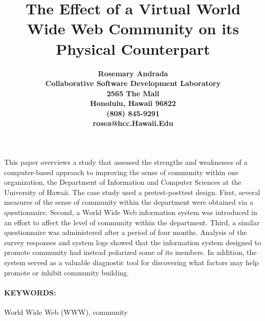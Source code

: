 



\title{The Effect of a Virtual World Wide Web Community on its Physical Counterpart}

\author{
\bf{Rosemary Andrada} \\
Collaborative Software Development Laboratory \\
2565 The Mall \\
Honolulu, Hawaii 96822 \\
(808) 845-9291 \\
rosea@hcc.Hawaii.Edu}

\maketitle

\abstract 

This paper overviews a study that assessed the strengths and weaknesses of a
computer-based approach to improving the sense of community within one
organization, the Department of Information and Computer Sciences at the
University of Hawaii.  The case study used a pretest-posttest design.  First,
several measures of the sense of community within the department were obtained
via a questionnaire.  Second, a World Wide Web information system was
introduced in an effort to affect the level of community within the department.
Third, a similar questionnaire was administered after a period of four months.
Analysis of the survey responses and system logs showed that the information
system designed to promote community had instead polarized some of its members.
In addition, the system served as a valuable diagnostic tool for discovering
what factors may help promote or inhibit community building.

\paragraph{KEYWORDS:} World Wide Web (WWW), community

